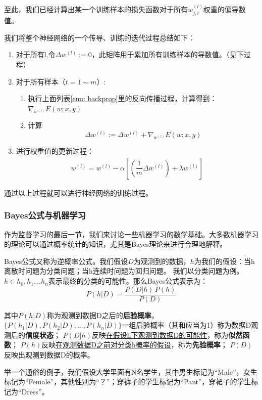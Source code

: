 至此，我们已经计算出某一个训练样本的损失函数对于所有$w^{(l)}_{j,i}$权重的偏导数值。

我们将整个神经网络的一个传导、训练的迭代过程总结如下：
\begin{enumerate}
\item 对于所有l,令$\Delta w^{(l)} := 0$，此矩阵用于累加所有训练样本的导数值。（见下过程）
\item 对于所有样本（$t = 1\sim m$）:
    \begin{enumerate}
    \item 执行上面列表\ref{enu: backprop}里的反向传播过程，计算得到：$\nabla_{w^{(l)}}E(w;x,y)$
    \item 计算
    $$\Delta w^{(l)}:= \Delta w^{(l)} + \nabla_{w^{(l)}}E(w;x,y)$$
    \end{enumerate}
\item 进行权重值的更新过程：
\begin{equation}
\begin{aligned}
w^{(l)} = w^{(l)} - \alpha [(\dfrac{1}{m}\Delta w^{(l)}) + \lambda w^{(l)}] 
\end{aligned}
\end{equation}
\end{enumerate}

通过以上过程就可以进行神经网络的训练过程。

\subsubsection{Bayes公式与机器学习}
作为监督学习的最后一节，我们来讨论一些机器学习的数学基础。大多数机器学习的理论可以通过概率统计的知识，尤其是Bayes理论来进行合理地解释。

Bayes公式又称为逆概率公式。我们假设$D$为观测到的数据，$h$为我们的假设：当h离散时问题为分类问题；当h连续时问题为回归问题。 我们以分类问题为例。$h\in{h_0,h_1,..h_n}$表示最终的分类的可能性。那么Bayes公式表示为：
\begin{equation}
P(h|D) = \dfrac{P(D|h)\,P(h)}{P(D)}
\end{equation}

其中$P(h|D)$称为观测到数据D之后的\textbf{后验概率}，$\{P(h_1|D),P(h_2|D),...,P(h_n|D)\}$一组后验概率（其和应当为1）称为数据D观测后的\textbf{信度状态}；
$P(D|h)$反映\uline{在假设h下观测到数据D的可能性}，称为\textbf{似然函数}；
$P(h)$反映\uline{在观测数据D之前对分类h概率的假设}，称为\textbf{先验概率}；
$P(D)$反映出观测到数据D的概率。

举一个通俗的例子，我们假设大学里面有N名学生，其中男生标记为“Male”，女生标记为“Female”，其他性别为“？”；穿裤子的学生标记为“Pant”，穿裙子的学生标记为“Dress”。

